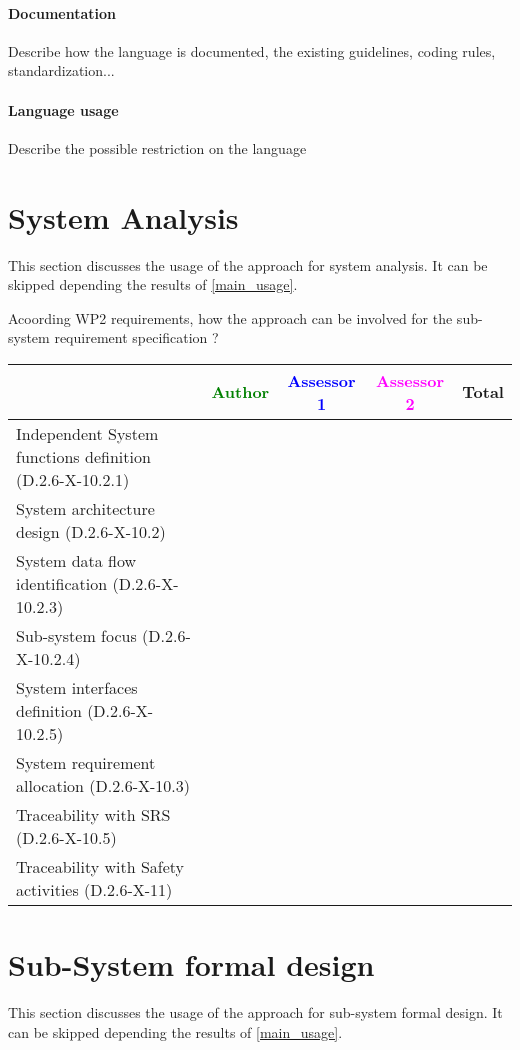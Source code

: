 \paragraph{Documentation} Describe how the language is documented, the existing guidelines, coding rules, standardization...

\paragraph{Language usage} Describe the possible restriction on the language

\section{System Analysis}
This section discusses the usage of the approach for system analysis.
It can be skipped depending the results of \ref{main_usage}.

Acoording WP2 requirements, how the approach can be involved for the sub-system requirement specification ?

\begin{tabular}{|l | c | c | c | c|}
\hline
& \textcolor{green}{Author} & \textcolor{blue}{Assessor 1} & \textcolor{magenta}{Assessor 2} & Total \\
\hline
Independent System functions definition (D.2.6-X-10.2.1)  & & & &  \\
\hline 
System architecture design (D.2.6-X-10.2) & & & &  \\
\hline
System data flow identification (D.2.6-X-10.2.3)  & & & &  \\
\hline
Sub-system focus (D.2.6-X-10.2.4)  & & & &  \\
\hline
System interfaces definition (D.2.6-X-10.2.5)  & & & &  \\
\hline
System requirement allocation (D.2.6-X-10.3)  & & & &  \\
\hline
Traceability with SRS (D.2.6-X-10.5)  & & & &  \\
\hline
Traceability with Safety activities (D.2.6-X-11)  & & & &  \\
\hline
\end{tabular}



\section{Sub-System formal design}
This section discusses the usage of the approach for sub-system formal design.
It can be skipped depending the results of \ref{main_usage}.

